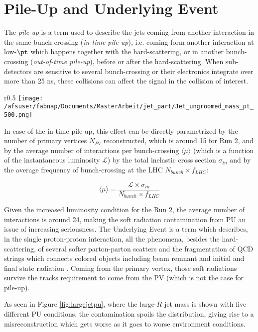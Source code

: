 \chapter{Pile-Up and Underlying Event}
The \textit{pile-up} is a term used to describe the jets coming from another interaction in the same bunch-crossing (\textit{in-time pile-up}), i.e. coming form another interaction at low-$\pt$ which happens together with the hard-scattering, or in another bunch-crossing (\textit{out-of-time pile-up}), before or after the hard-scattering. When sub-detectors are sensitive to several bunch-crossing or their electronics integrate over more than 25 ns, these collisions can affect the signal in the collision of interest.

\begin{wrapfigure}{r}{0.5\textwidth}
  \centering
      \texttt{[image: /afsuser/fabnap/Documents/MasterArbeit/jet\_part/Jet\_ungroomed\_mass\_pt\_500.png]}
  \caption[Effect of pile-up contamination]{Effect of pile-up contamination in large-$R$ jets: here shown different PU conditions parametrized by $\langle\mu\rangle$. From \cite{highlumi}.}
  \label{fig:largejetpu}
\end{wrapfigure}


In case of the in-time pile-up, this effect can be directly parametrized by the number of primary vertices $N_{PV}$ reconstructed, which is around 15 for Run 2, and by the average number of interactions per bunch-crossing $\langle \mu \rangle$ (which is a function of the instantaneous luminosity $\mathcal{L}$) by the total inelastic cross section $\sigma_{in}$ and by the average frequency of bunch-crossing at the LHC $N_{bunch}\times f_{LHC}$:

$$\langle \mu \rangle = \frac{\mathcal{L}\times\sigma_{in}}{N_{bunch}\times f_{LHC}} $$

Given the increased luminosity condition for the Run 2, the average number of interactions is around 24, making the soft radiation contamination from PU an issue of increasing seriousness. 
The Underlying Event is a term which describes, in the single proton-proton interaction, all the phenomena, besides the hard-scattering, of several softer parton-parton scatters and the fragmentation of QCD strings which connects colored objects including beam remnant and initial and final state radiation \cite{ue}. Coming from the primary vertex, those soft radiations survive the tracks requirement to come from the PV (which is not the case for pile-up).

As seen in Figure \ref{fig:largejetpu}, where the large-$R$ jet mass is shown with five different PU conditions, the contamination spoils the distribution, giving rise to a misreconstruction which gets worse as it goes to worse environment conditions.\\

